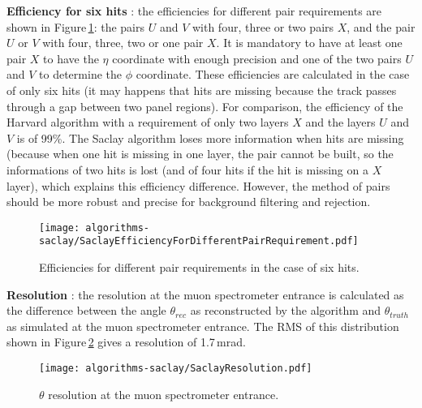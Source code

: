 \textbf{Efficiency for six hits} : the efficiencies for  different pair requirements are shown in Figure\,\ref{fig:SaclayEfficiencyForDifferentPairRequirement}: the pairs $U$ and $V$ with four, three or two pairs $X$, and the pair $U$ or $V$ with four, three, two or one pair $X$. It is mandatory to have at least one pair $X$ to have the $\eta$ coordinate with enough precision and one of the two pairs $U$ and $V$ to determine the $\phi$ coordinate. These efficiencies are calculated in the case of only six hits (it may happens that hits are missing because the track passes through a gap between two panel regions).
For comparison, the efficiency of the Harvard algorithm with a requirement of only two layers $X$ and the layers $U$ and $V$ is of 99\%. The Saclay algorithm loses more information when hits are missing (because when one hit is missing in one layer, the pair cannot be built, so the informations of two hits is lost (and of four hits if the hit is missing on a $X$ layer), which explains this efficiency difference. However, the method of pairs should be more robust and precise for background filtering and rejection.
  \begin{figure}[htb!]
  \centering
  \texttt{[image: algorithms-saclay/SaclayEfficiencyForDifferentPairRequirement.pdf]}
  \caption{Efficiencies for different pair requirements in the case of six hits.}
  \label{fig:SaclayEfficiencyForDifferentPairRequirement}
  \end{figure}

 \textbf{Resolution} : the resolution at the muon spectrometer entrance is calculated as the difference between the angle $\theta_{rec}$ as reconstructed by the algorithm and $\theta_{truth}$ as simulated at the muon spectrometer entrance. The RMS of this distribution shown in Figure\,\ref{fig:SaclayResolution} gives a resolution of 1.7\,mrad.
  \begin{figure}[htb!]
  \centering
  \texttt{[image: algorithms-saclay/SaclayResolution.pdf]}
  \caption{ $\theta$ resolution at the muon spectrometer entrance.}
  \label{fig:SaclayResolution}
  \end{figure}


